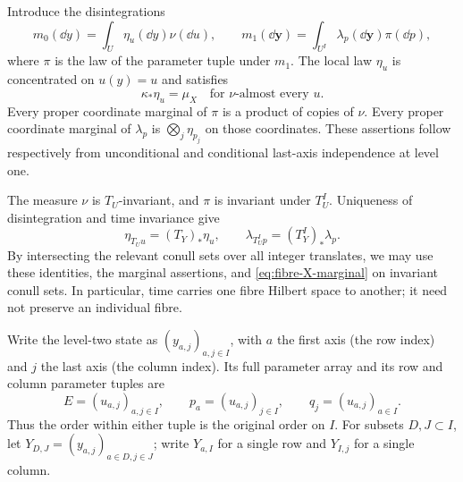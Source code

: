 Introduce the disintegrations
\begin{equation}\label{eq:local-and-row-disintegrations}
 m_0(\dd y)=\int_U\eta_u(\dd y)\nu(\dd u),\qquad
 m_1(\dd\mathbf y)=\int_{U^I}\lambda_p(\dd\mathbf y)\pi(\dd p),
\end{equation}
where $\pi$ is the law of the parameter tuple under $m_1$.
The local law $\eta_u$ is concentrated on $u(y)=u$ and satisfies
\begin{equation}\label{eq:fibre-X-marginal}
 \kappa_*\eta_u=\mu_X\quad\text{for }\nu\text{-almost every }u.
\end{equation}
Every proper coordinate marginal of $\pi$ is a product of copies of
$\nu$.  Every proper coordinate marginal of $\lambda_p$ is
$\bigotimes_j\eta_{p_j}$ on those coordinates.  These assertions follow
respectively from unconditional and conditional last-axis independence
at level one.

The measure $\nu$ is $T_U$-invariant, and $\pi$ is invariant under
$T_U^I$.  Uniqueness of disintegration and time invariance give
\begin{equation}\label{eq:fibre-time-equivariance}
 \eta_{T_Uu}=(T_Y)_*\eta_u,\qquad
 \lambda_{T_U^Ip}=(T_Y^I)_*\lambda_p.
\end{equation}
By intersecting the relevant conull sets over all integer translates,
we may use these identities, the marginal assertions, and
\eqref{eq:fibre-X-marginal} on invariant conull sets.  In particular,
time carries one fibre Hilbert space to another; it need not preserve
an individual fibre.

Write the level-two state as $(y_{a,j})_{a,j\in I}$, with $a$ the first
axis (the row index) and $j$ the last axis (the column index).  Its full
parameter array and its row and column parameter tuples are
\[
 E=(u_{a,j})_{a,j\in I},\qquad
 p_a=(u_{a,j})_{j\in I},\qquad q_j=(u_{a,j})_{a\in I}.
\]
Thus the order within either tuple is the original order on $I$.
For subsets $D,J\subset I$, let
$Y_{D,J}=(y_{a,j})_{a\in D,j\in J}$; write $Y_{a,I}$ for a single row
and $Y_{I,j}$ for a single column.

